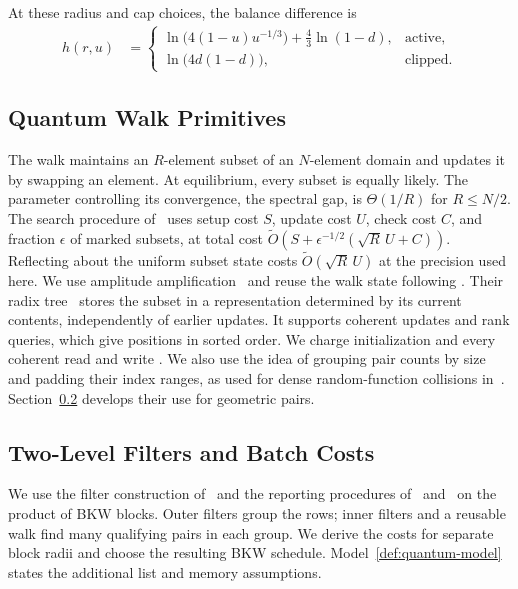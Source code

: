 \documentclass[runningheads,envcountsame,envcountsect,orivec]{llncs}
\begin{document}
At these radius and cap choices, the balance difference is
\begin{align}
 h(r,u)&=
 \begin{cases}
 \ln\bigl(4(1-u)u^{-1/3}\bigr)+\tfrac43\ln(1-d),
       &\text{active},\\[1mm]
 \ln\bigl(4d(1-d)\bigr),
       &\text{clipped}.
 \end{cases}
 \label{q:full-residual}
\end{align}

\subsection{Quantum Walk Primitives}

The walk maintains an $R$-element subset of an $N$-element
domain and updates it by swapping an element. At equilibrium,
every subset is equally likely. The parameter controlling its
convergence, the spectral gap, is $\Theta(1/R)$ for $R\le N/2$.
The search procedure of~\cite[Theorem~3]{MNRS11}
uses setup cost $S$, update cost $U$, check cost $C$, and
fraction $\epsilon$ of marked subsets, at total cost
$\widetilde O(S+\epsilon^{-1/2}(\sqrt R\,U+C))$.
Reflecting about the uniform subset state costs
$\widetilde O(\sqrt R\,U)$ at the precision used here.
We use amplitude amplification~\cite{BBHT98,BHMT02} and
reuse the walk state following
\cite[Section~4]{BCSS23}. Their radix tree~\cite[Section~5]{BCSS23} stores the subset
in a representation determined by its current contents,
independently of earlier updates. It supports coherent updates
and rank queries, which give positions in sorted order. We charge
initialization and every coherent read and write
\cite{GLM08,BCSS23}. We also use the idea of grouping pair counts by size and
padding their index ranges, as used for dense random-function
collisions in~\cite{BLSS25}. Section~\ref{app:walk-rounds} develops their use for geometric pairs.

\subsection{Two-Level Filters and Batch Costs}
\label{app:walk-rounds}

We use the filter construction of~\cite{CL21} and the reporting
procedures of~\cite{BCSS23} and~\cite{BLSS25} on the product
of BKW blocks. Outer filters group the rows;
inner filters and a reusable walk find many qualifying pairs
in each group. We derive the costs for separate block radii
and choose the resulting BKW schedule.
Model~\ref{def:quantum-model} states the additional list and memory assumptions.
\end{document}
